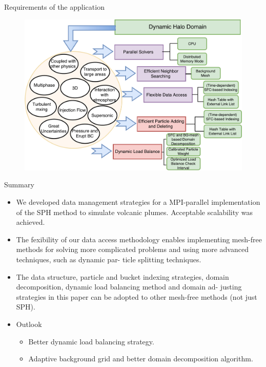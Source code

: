 \documentclass{beamer}
\begin{document}
\begin{frame}{Requirements of the application}
\begin{figure}[!t]
\centering
\includegraphics[scale=0.35]{Requirement_all}
\label{fig:Requirements}
\end{figure}
\end{frame}

\begin{frame}{Summary}
  \begin{itemize}
  \item
    We developed data management strategies for a MPI-parallel implementation of the SPH
method to simulate volcanic plumes. Acceptable scalability was achieved.
  \item
    The fexibility of our data access methodology enables implementing mesh-free methods for
solving more complicated problems and using more advanced techniques, such as dynamic par-
ticle splitting techniques.
  \item
    The data structure, particle and bucket
indexing strategies, domain decomposition, dynamic load balancing method and domain ad-
justing strategies in this paper can be adopted to other mesh-free methods (not just SPH).
  \end{itemize}
  
  \begin{itemize}
  \item
    Outlook
    \begin{itemize}
    \item
      Better dynamic load balancing strategy.
    \item
      Adaptive background grid and better domain decomposition algorithm.
    \end{itemize}
  \end{itemize}
\end{frame}
\end{document}
